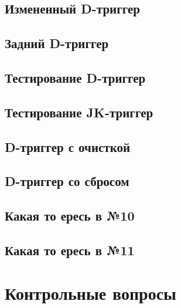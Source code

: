 \documentclass[a4paper,14pt]{article}
\begin{document}
\subsection{Измененный D-триггер}



\subsection{Задний D-триггер}



\subsection{Тестирование D-триггер}

\subsection{Тестирование JK-триггер}

\subsection{D-триггер с очисткой}


\subsection{D-триггер со сбросом}


\subsection{Какая то ересь в №10}


\subsection{Какая то ересь в №11}


\section{Контрольные вопросы}
\end{document}
